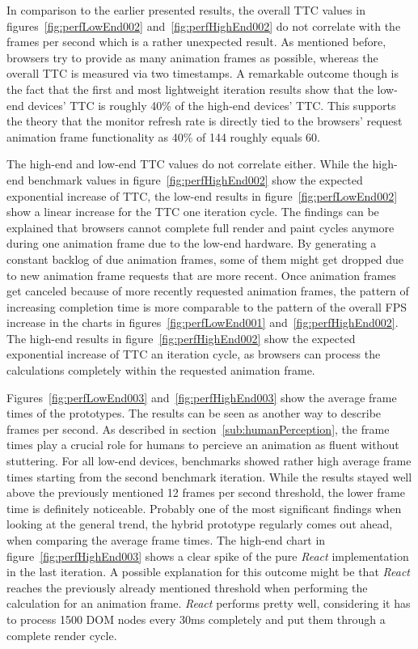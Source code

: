 In comparison to the earlier presented results, the overall TTC values in figures~\ref{fig:perfLowEnd002} and~\ref{fig:perfHighEnd002} do not correlate with the frames per second which is a rather unexpected result. As mentioned before, browsers try to provide as many animation frames as possible, whereas the overall TTC is measured via two timestamps. A remarkable outcome though is the fact that the first and most lightweight iteration results show that the low-end devices' TTC is roughly 40\% of the high-end devices' TTC. This supports the theory that the monitor refresh rate is directly tied to the browsers' request animation frame functionality as 40\% of 144 roughly equals 60. 

The high-end and low-end TTC values do not correlate either. While the high-end benchmark values in figure~\ref{fig:perfHighEnd002} show the expected exponential increase of TTC, the low-end results in figure~\ref{fig:perfLowEnd002} show a linear increase for the TTC one iteration cycle. The findings can be explained that browsers cannot complete full render and paint cycles anymore during one animation frame due to the low-end hardware. By generating a constant backlog of due animation frames, some of them might get dropped due to new animation frame requests that are more recent. Once animation frames get canceled because of more recently requested animation frames, the pattern of increasing completion time is more comparable to the pattern of the overall FPS increase in the charts in figures~\ref{fig:perfLowEnd001} and~\ref{fig:perfHighEnd002}. The high-end results in figure~\ref{fig:perfHighEnd002} show the expected exponential increase of TTC an iteration cycle, as browsers can process the calculations completely within the requested animation frame.

Figures~\ref{fig:perfLowEnd003} and~\ref{fig:perfHighEnd003} show the average frame times of the prototypes. The results can be seen as another way to describe frames per second. As described in section~\ref{sub:humanPerception}, the frame times play a crucial role for humans to percieve an animation as fluent without stuttering. For all low-end devices, benchmarks showed rather high average frame times starting from the second benchmark iteration. While the results stayed well above the previously mentioned 12 frames per second threshold, the lower frame time is definitely noticeable. Probably one of the most sig\-nifi\-cant findings when looking at the general trend, the hybrid prototype regularly comes out ahead, when comparing the average frame times. The high-end chart in figure~\ref{fig:perfHighEnd003} shows a clear spike of the pure \emph{React} implementation in the last iteration. A possible explanation for this outcome might be that \emph{React} reaches the previously already mentioned threshold when performing the calculation for an animation frame. \emph{React} performs pretty well, considering it has to process 1500 DOM nodes every 30ms completely and put them through a complete render cycle.

